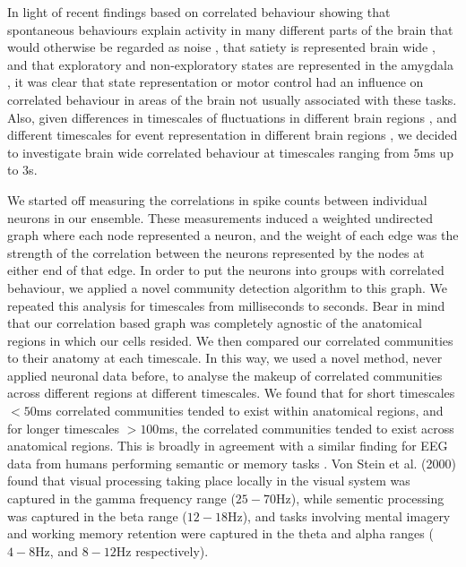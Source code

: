 
In light of recent findings based on correlated behaviour showing that spontaneous behaviours explain activity in many different parts of the brain that would otherwise be regarded as noise \parencite{stringer}, that satiety is represented brain wide \cite{allen}, and that exploratory and non-exploratory states are represented in the amygdala \cite{grundemann}, it was clear that state representation or motor control had an influence on correlated behaviour in areas of the brain not usually associated with these tasks. Also, given differences in timescales of fluctuations in different brain regions \cite{murray}, and different timescales for event representation in different brain regions \cite{baldassano}, we decided to investigate brain wide correlated behaviour at timescales ranging from $5$ms up to $3$s.

We started off measuring the correlations in spike counts between individual neurons in our ensemble. These measurements induced a weighted undirected graph where each node represented a neuron, and the weight of each edge was the strength of the correlation between the neurons represented by the nodes at either end of that edge. In order to put the neurons into groups with correlated behaviour, we applied a novel community detection algorithm \parencite{humphries} to this graph. We repeated this analysis for timescales from milliseconds to seconds. Bear in mind that our correlation based graph was completely agnostic of the anatomical regions in which our cells resided. We then compared our correlated communities to their anatomy at each timescale. In this way, we used a novel method, never applied neuronal data before, to analyse the makeup of correlated communities across different regions at different timescales. We found that for short timescales $<50$ms correlated communities tended to exist within anatomical regions, and for longer timescales $>100$ms, the correlated communities tended to exist across anatomical regions. This is broadly in agreement with a similar finding for EEG data from humans performing semantic or memory tasks \parencite{von_stein}. Von Stein et al. (2000) found that visual processing taking place locally in the visual system was captured in the gamma frequency range ($25-70$Hz), while sementic processing was captured in the beta range ($12-18$Hz), and tasks involving mental imagery and working memory retention were captured in the theta and alpha ranges ($4-8$Hz, and $8-12$Hz respectively).

